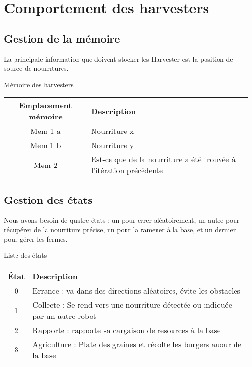 \documentclass{article}
\begin{document}
\section{Comportement des harvesters}


\subsection{Gestion de la mémoire}

La principale information que doivent stocker les Harvester est la position de source de nourritures.
\newline

\begin{table}[!htb]
	Mémoire des harvesters\\
	\begin{tabular}{|c|l|}
		\hline
		Emplacement mémoire & Description\\
		\hline
		Mem 1 a & Nourriture x\\
		Mem 1 b & Nourriture y\\
		\hline
                Mem 2 & Est-ce que de la nourriture a été trouvée à l'itération précédente\\
                \hline
	\end{tabular}
\end{table}

\subsection{Gestion des états}

Nous avons besoin de quatre états : un pour errer aléatoirement, un autre pour récupérer de la nourriture précise, un pour la ramener à la base, et un dernier pour gérer les fermes.

\begin{table}[!htb]
	Liste des états\\
	\begin{tabular}{|c|l|}
		\hline
		État & Description \\
		\hline
		0 & Errance : va dans des directions aléatoires, évite les obstacles\\
		\hline
		1 & Collecte : Se rend vers une nourriture détectée ou indiquée par un autre robot\\
		\hline
		2 & Rapporte : rapporte sa cargaison de resources à la base\\
		\hline
		3 & Agriculture : Plate des graines et récolte les burgers auour de la base\\
		\hline
	\end{tabular}
\end{table}
\end{document}
